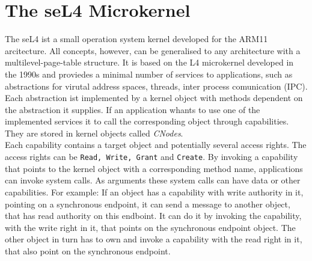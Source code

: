 \section{The seL4 Microkernel}\label{sec:seL4}
	The seL4 \cite{Manual} ist a small operation system kernel developed for the ARM11 arcitecture. All concepts, however, can be generalised to any architecture with a multilevel-page-table structure. \cite{PhDseL4} It is based on the L4 microkernel developed in the 1990s and proviedes a minimal number of services to applications, such as abstractions for virutal address spaces, threads, inter process comunication (IPC). \\
	Each abstraction ist implemented by a kernel object with methods dependent on the abstraction it supplies. If an application whants to use one of the implemented services it to call the corresponding object through capabilities. They are stored in kernel objects called \textit{CNodes}. \\
	Each capability contains a target object and potentially several access rights. The access rights can be \texttt{Read, Write, Grant} and \texttt{Create}. By invoking a capability that points to the kernel object  with a corresponding method name, applications can invoke system calls. As arguments these system calls can have data or other capabilities. For example: If an object has a capability with write authority in it, pointing on a synchronous endpoint, it can send a message to another object, that has read authority on this endboint. It can do it by invoking the capability, with the write right in it, that points on the synchronous endpoint object. The other object in turn has to own and invoke a capability with the read right in it, that also point on the synchronous endpoint.

